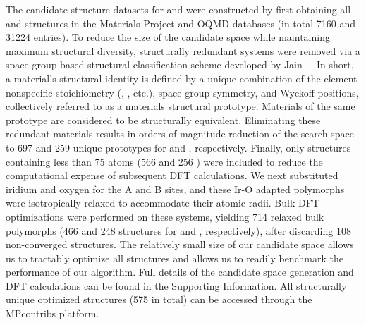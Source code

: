 %
%
%
The candidate structure datasets for \IrOtwo and \IrOthree were constructed by first obtaining all \ABtwo and \ABthree structures in the Materials Project\cite{Jain2013} and OQMD\cite{Kirklin2015} databases
(in total \num{7160} \ABtwo and \num{31224} \ABthree entries).
%
To reduce the size of the candidate space while maintaining maximum structural diversity, structurally redundant systems were removed via a space group based structural classification scheme developed by Jain ~\cite{Jain2018}.
%
In short, a material's structural identity is defined by a unique combination of the element-nonspecific stoichiometry (\ABtwo, \ABthree, etc.), space group symmetry, and Wyckoff positions, collectively referred to as a materials structural prototype.
%
Materials of the same prototype are considered to be structurally equivalent.
%
%
Eliminating these redundant materials results in orders of magnitude reduction of the search space to \num{697} and \num{259} unique prototypes for \ABtwo and \ABthree, respectively.
%
%
Finally, only structures containing less than \num{75} atoms
(\num{566} \ABtwo and \num{256} \ABthree)
were included to reduce the computational expense of subsequent DFT calculations.
%
We next substituted iridium and oxygen for the A and B sites, and these Ir-O adapted polymorphs were isotropically relaxed to accommodate their atomic radii.
%
Bulk DFT optimizations were performed on these systems,
yielding \num{714} relaxed bulk \IrOx polymorphs
(\num{466} and \num{248} structures for \IrOtwo and \IrOthree, respectively),
after discarding \num{108} non-converged structures.
%
The relatively small size of our candidate space allows us to tractably optimize all structures and allows us to readily benchmark the performance of our algorithm.
%
Full details of the candidate space generation and DFT calculations can be found in the Supporting Information.
%
All structurally unique \IrOx optimized structures (\num{575} in total) can be accessed through the MPcontribs platform.~\cite{upload_MPContribs}


